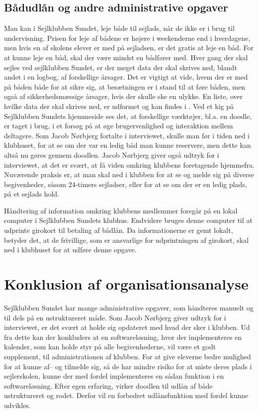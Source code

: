 \subsection{Bådudlån og andre administrative opgaver}\label{subsec:bådudlån}

Man kan i Sejlklubben Sundet, leje både til sejlads, når de ikke er i brug til undervisning. 
Prisen for leje af bådene er højere i weekenderne end i hverdagene, men hvis en af skolens elever er med på sejladsen, er det gratis at leje en båd. 
For at kunne leje en båd, skal der være mindst en bådfører med.
Hver gang der skal sejles ved sejlklubben Sundet, er der meget data der skal skrives ned, blandt andet i en logbog, af forskellige årsager. Det er vigtigt at vide, hvem der er med på båden både for at sikre sig, at besætningen er i stand til at føre båden, men også af sikkerhedsmæssige årsager, hvis der skulle ske en ulykke. 
En liste, over hvilke data der skal skrives ned, er udformet og kan findes i . 
Ved et kig på Sejlklubben Sundets hjemmeside \citep{SundetUdlaan} ses det, at forskellige værktøjer, bl.a. en doodle, er taget i brug, i et forsøg på at øge brugervenlighed og interaktion mellem deltagere. 
Som Jacob Nørbjerg fortalte i interviewet, skulle man før i tiden ned i klubhuset, for at se om der var en ledig båd man kunne reservere, men dette kan altså nu gøres gennem doodlen. Jacob Nørbjerg  giver også udtryk for i interviewet, at det er svært, at få viden omkring klubbens foretagende hjemmefra. 
Nuværende praksis er, at man skal ned i klubben for at se og melde sig på diverse begivenheder, såsom 24-timers sejladser, eller for at se om der er en ledig plads, på et sejlads hold.

Håndtering af information omkring klubbens medlemmer foregår på en lokal computer i Sejlklubben Sundets
klubhus. Endvidere bruges denne computer til at udprinte girokort til betaling af bådlån. Da informationerne
er gemt lokalt, betyder det, at de frivillige, som er ansvarlige for udprintningen af girokort, skal ned i
klubhuset for at udføre denne opgave.


\section{Konklusion af organisationsanalyse}\label{sec:organisation-konklusion}

Sejlklubben Sundet har mange administrative opgaver, som håndteres manuelt og til dels på en ustruktureret
måde. 
Som Jacob Nørbjerg giver udtryk for i interviewet, er det svært at holde sig opdateret med hvad der sker i klubben. Ud fra dette kan der konkluders at en softwareløsning, hvor der implementeres en kalender, som kan holde styr på alle begivenhederne, vil være et godt supplement, til administrationen af klubben. 
For at give eleverne bedre mulighed for at kunne af-- og tilmelde sig, så de har mindre risiko for at miste deres plads i sejlerskolen, kunne der med fordel implementeres en sådan funktion i en softwareløsning. 
Efter egen erfaring, virker doodlen til udlån af både ustruktureret og rodet. 
Derfor vil en forbedret udlånsfunktion med fordel kunne udvikles.

